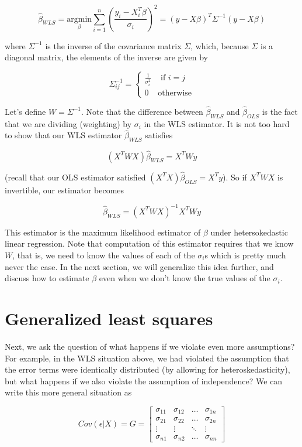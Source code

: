 $$\hat{\beta}_{WLS} = \underset{\beta}{\text{argmin}} \sum_{i=1}^n \left(\frac{y_i - X_i^T \beta}{\sigma_i} \right)^2 = (y - X\beta)^T\Sigma^{-1}(y - X\beta)$$

where $\Sigma^{-1}$ is the inverse of the covariance matrix $\Sigma$, which, because $\Sigma$ is a diagonal matrix, the elements of the inverse are given by

$$\Sigma^{-1}_{ij} = \begin{cases} \frac{1}{\sigma_i^2} & \text{ if } i = j \\ 0 &\text{otherwise} \end{cases}$$

Let's define $W = \Sigma^{-1}$. Note that the difference between $\hat{\beta}_{WLS}$ and $\hat{\beta}_{OLS}$ is the fact that we are dividing (weighting) by $\sigma_i$ in the WLS estimator. It is not too hard to show that our WLS estimator $\hat{\beta}_{WLS}$ satisfies

$$(X^TWX)\hat{\beta}_{WLS} = X^TWy$$

(recall that our OLS estimator satisfied $(X^TX)\hat{\beta}_{OLS} = X^Ty$). So if $X^TWX$ is invertible, our estimator becomes

$$\hat{\beta}_{WLS} = (X^TWX)^{-1}X^TWy$$

This estimator is the maximum likelihood estimator of $\beta$ under hetersokedastic linear regression. Note that computation of this estimator requires that we know $W$, that is, we need to know the values of each of the $\sigma_i$s which is pretty much never the case. In the next section, we will generalize this idea further, and discuss how to estimate $\beta$ even when we don't know the true values of the $\sigma_i$.






\section{Generalized least squares}

Next, we ask the question of what happens if we violate even more assumptions? For example, in the WLS situation above, we had violated the assumption that the error terms were identically distributed (by allowing for heteroskedasticity), but what happens if we also violate the assumption of independence? We can write this more general situation as



$$Cov(\epsilon | X) = G = \left[ \begin{array}{cccc} \sigma_{11} &  \sigma_{12} & \dots & \sigma_{1n}\\
 \sigma_{21} & \sigma_{22} & \dots & \sigma_{2n}\\
 \vdots & \vdots & \ddots & \vdots\\
 \sigma_{n1} & \sigma_{n2} & \dots & \sigma_{nn}\end{array} \right]$$

